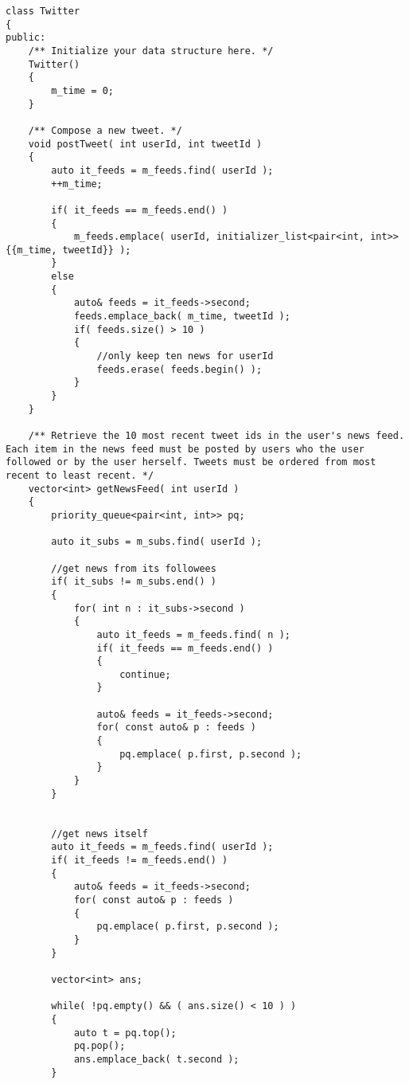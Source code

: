 \setcounter{lstlisting}{0}
\begin{lstlisting}[style=customc, caption={Priority Queue}]
class Twitter
{
public:
    /** Initialize your data structure here. */
    Twitter()
    {
        m_time = 0;
    }

    /** Compose a new tweet. */
    void postTweet( int userId, int tweetId )
    {
        auto it_feeds = m_feeds.find( userId );
        ++m_time;

        if( it_feeds == m_feeds.end() )
        {
            m_feeds.emplace( userId, initializer_list<pair<int, int>> {{m_time, tweetId}} );
        }
        else
        {
            auto& feeds = it_feeds->second;
            feeds.emplace_back( m_time, tweetId );
            if( feeds.size() > 10 )
            {
                //only keep ten news for userId
                feeds.erase( feeds.begin() );
            }
        }
    }

    /** Retrieve the 10 most recent tweet ids in the user's news feed. Each item in the news feed must be posted by users who the user followed or by the user herself. Tweets must be ordered from most recent to least recent. */
    vector<int> getNewsFeed( int userId )
    {
        priority_queue<pair<int, int>> pq;

        auto it_subs = m_subs.find( userId );

        //get news from its followees
        if( it_subs != m_subs.end() )
        {
            for( int n : it_subs->second )
            {
                auto it_feeds = m_feeds.find( n );
                if( it_feeds == m_feeds.end() )
                {
                    continue;
                }

                auto& feeds = it_feeds->second;
                for( const auto& p : feeds )
                {
                    pq.emplace( p.first, p.second );
                }
            }
        }


        //get news itself
        auto it_feeds = m_feeds.find( userId );
        if( it_feeds != m_feeds.end() )
        {
            auto& feeds = it_feeds->second;
            for( const auto& p : feeds )
            {
                pq.emplace( p.first, p.second );
            }
        }

        vector<int> ans;

        while( !pq.empty() && ( ans.size() < 10 ) )
        {
            auto t = pq.top();
            pq.pop();
            ans.emplace_back( t.second );
        }


\end{lstlisting}
